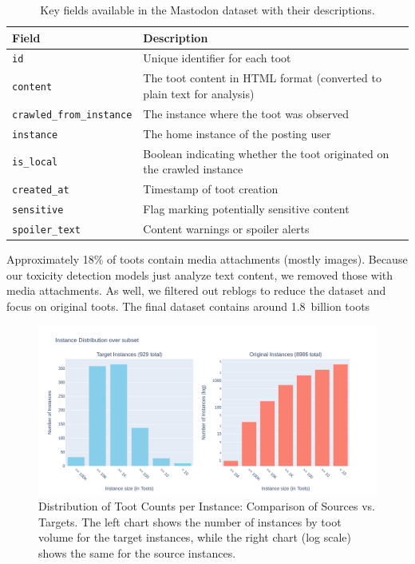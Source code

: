 \begin{table}[tb]
    \centering\small
    \renewcommand{\arraystretch}{1.3}
    \begin{tabularx}{\textwidth}{lX}
        \toprule
        \textbf{Field} & \textbf{Description} \\
        \midrule
        \texttt{id} & Unique identifier for each toot \\
        \texttt{content} & The toot content in HTML format (converted to plain text for analysis) \\
        \texttt{crawled\_from\_instance} & The instance where the toot was observed \\
        \texttt{instance} & The home instance of the posting user \\
        \texttt{is\_local} & Boolean indicating whether the toot originated on the crawled instance \\
        \texttt{created\_at} & Timestamp of toot creation \\
        \texttt{sensitive} & Flag marking potentially sensitive content \\
        \texttt{spoiler\_text} & Content warnings or spoiler alerts \\
        \bottomrule
    \end{tabularx}
    \caption{Key fields available in the Mastodon dataset with their descriptions.}
    \label{dataset-fields}
\end{table}

Approximately 18\% of toots contain media attachments (mostly images). Because our toxicity detection models just analyze text content, we removed those with media attachments. As well, we filtered out reblogs to reduce the dataset and focus on original toots. The final dataset contains around 1.8~billion toots

\begin{figure}[tb]
    \centering
    \includegraphics[width=\textwidth]{../material/instance_distribution.png}
    \caption{Distribution of Toot Counts per Instance: Comparison of Sources vs. Targets. The left chart shows the number of instances by toot volume for the target instances, while the right chart (log scale) shows the same for the source instances.}
    \label{instance-distribution}
\end{figure}


